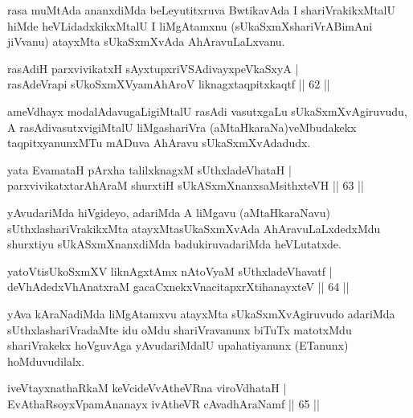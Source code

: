 \begin{artha}
rasa muMtAda ananxdiMda beLeyutitxruva BwtikavAda I shariVrakikxMtalU hiMde heVLidadxkikxMtalU I liMgAtamxnu (sUkaSxmXshariVrABimAni jiVvanu) atayxMta sUkaSxmXvAda AhAravuLaLxvanu.
\end{artha}


\begin{shl}
rasAdiH parxvivikatxH sAyxtupxriVSAdivayxpeVkaSxyA |\\
rasAdeVrapi sUkoSxmXV\s yamAhAroV liknagxtaqpitxkaqtf \hfill || 62 || 
\end{shl}

\begin{artha}
ameVdhayx modalAdavugaLigiMtalU rasAdi vasutxgaLu sUkaSxmXvAgiruvudu, A rasAdivasutxvigiMtalU liMgashariVra (aMtaHkaraNa)veMbudakekx taqpitxyanunxMTu mADuva AhAravu sUkaSxmXvAdadudx.
\end{artha}

\begin{shl}
yata EvamataH pArxha talilxknagxM sUthxladeVhataH |\\
parxvivikatxtarAhAraM shurxtiH sUkASxmXnanxsaMsithxteVH \hfill || 63 || 
\end{shl}

\begin{artha}
yAvudariMda hiVgideyo, adariMda A liMgavu (aMtaHkaraNavu) sUthxlashariVrakikxMta atayxMtasUkaSxmXvAda AhAravuLaLxdedxMdu shurxtiyu sUkASxmXnanxdiMda badukiruvadariMda heVLutatxde.
\end{artha}

\begin{shl}
yatoV\s tisUkoSxmXV liknAgxtAmx nAtoV\s yaM sUthxladeVhavatf |\\
deVhAdedxVhAnatxraM gacaCxnekxVnacitapxrXtihanayxteV \hfill || 64 || 
\end{shl}

\begin{artha}
yAva kAraNadiMda liMgAtamxvu atayxMta sUkaSxmXvAgiruvudo adariMda sUthxlashariVradaMte idu oMdu shariVravanunx biTuTx matotxMdu shariVrakekx hoVguvAga yAvudariMdalU upahatiyanunx (ETanunx) hoMduvudilalx.
\end{artha}


\begin{shl}
iveVtayxnathaRkaM keVcideVvAtheVRna viroVdhataH |\\
EvAthaRsoyxVpamAnanayx ivAtheVR cAvadhAraNamf \hfill || 65 || 
\end{shl}

